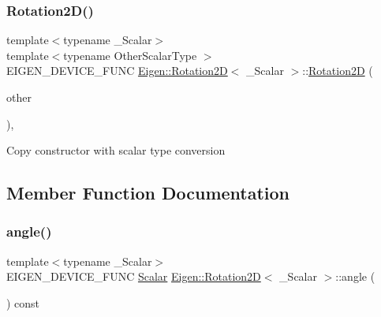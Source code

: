 \subsubsection{\texorpdfstring{Rotation2D()}{Rotation2D()}\hspace{0.1cm}{\footnotesize\ttfamily [4/4]}}
{\footnotesize\ttfamily template$<$typename \+\_\+\+Scalar$>$ \\
template$<$typename Other\+Scalar\+Type $>$ \\
E\+I\+G\+E\+N\+\_\+\+D\+E\+V\+I\+C\+E\+\_\+\+F\+U\+NC \mbox{\hyperlink{class_eigen_1_1_rotation2_d}{Eigen\+::\+Rotation2D}}$<$ \+\_\+\+Scalar $>$\+::\mbox{\hyperlink{class_eigen_1_1_rotation2_d}{Rotation2D}} (\begin{DoxyParamCaption}\item[{const \mbox{\hyperlink{class_eigen_1_1_rotation2_d}{Rotation2D}}$<$ Other\+Scalar\+Type $>$ \&}]{other }\end{DoxyParamCaption})\hspace{0.3cm}{\ttfamily [inline]}, {\ttfamily [explicit]}}

Copy constructor with scalar type conversion 

\subsection{Member Function Documentation}
\mbox{\label{class_eigen_1_1_rotation2_d_af34ab8da6bfe010ca66c8acafa239a6e}} 
\subsubsection{\texorpdfstring{angle()}{angle()}\hspace{0.1cm}{\footnotesize\ttfamily [1/2]}}
{\footnotesize\ttfamily template$<$typename \+\_\+\+Scalar$>$ \\
E\+I\+G\+E\+N\+\_\+\+D\+E\+V\+I\+C\+E\+\_\+\+F\+U\+NC \mbox{\hyperlink{class_eigen_1_1_rotation2_d_ac20c665ece0f197a712a2a39ae72e4e4}{Scalar}} \mbox{\hyperlink{class_eigen_1_1_rotation2_d}{Eigen\+::\+Rotation2D}}$<$ \+\_\+\+Scalar $>$\+::angle (\begin{DoxyParamCaption}{ }\end{DoxyParamCaption}) const\hspace{0.3cm}{\ttfamily [inline]}}

